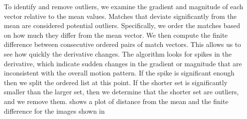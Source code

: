 To identify and remove outliers, we examine the gradient and magnitude of each vector relative to the mean values. Matches that deviate significantly from the mean are considered potential outliers. Specifically, we order the matches based on how much they differ from the mean vector. We then compute the finite difference between consecutive ordered pairs of match vectors. This allows us to see how quickly the derivative changes. The algorithm looks for spikes in the derivative, which indicate sudden changes in the gradient or magnitude that are inconsistent with the overall motion pattern. If the spike is significant enough then we split the ordered list at this point. If the shorter set is significantly smaller than the larger set, then we determine that the shorter set are outliers, and we remove them.  shows a plot of distance from the mean and the finite difference for the images shown in \\

